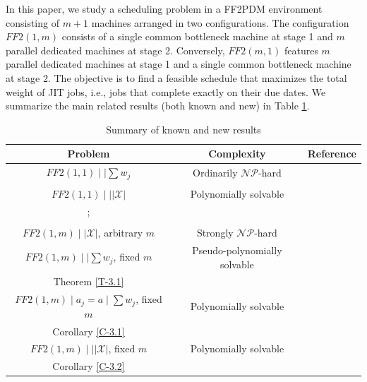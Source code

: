 \documentclass[12pt, eqno, limlimits]{article}
\begin{document}
\begin{sloppypar}
        In this paper, we study a scheduling problem in a FF2PDM environment consisting of $m+1$ machines arranged in two configurations. The configuration $FF2(1, m)$ consists of a single common bottleneck machine at stage 1 and $m$ parallel dedicated machines at stage 2. Conversely, $FF2(m, 1)$ features $m$ parallel dedicated machines at stage 1 and a single common bottleneck machine at stage 2. The objective is to find a feasible schedule that maximizes the total weight of JIT jobs, i.e., jobs that complete exactly on their due dates. We summarize the main related results (both known and new) in Table \ref{tab:main_results}.
        \begin{table}[htpb]
                \footnotesize
                \setlength{\tabcolsep}{2 pt}
                \caption{Summary of known and new results} \label{tab:main_results}
                \vspace{-8pt} 
                \begin{center}
                    \begin{tabular}{|c|c|c|} \hline
                        Problem &  Complexity & Reference \\ \hline
                        $FF2(1, 1) \mid \mid \sum w_j$ & Ordinarily $\mathcal{NP}$-hard & \makecell{\cite{ChoiYoon2007JOS}; \\ \cite{ShabtayBensoussan2012JOS}} \\ \hline
                        $FF2(1, 1) \mid \mid |\mathcal{X}|$	& Polynomially solvable  & \makecell{\cite{ChoiYoon2007JOS}; \\ \cite{Shabtay2012EJOR}; \\ \cite{HeegerHISShabtay2026}} \\ \hline
                        $FF2(1, m)\mid \mid \mathcal{X}|$, arbitrary $m$ & Strongly $\mathcal{NP}$-hard & \cite{HeegerHISShabtay2026} \\ \hline
                        $FF2(1, m)\mid \mid \sum w_j$, fixed $m$ & Pseudo-polynomially solvable	& \makecell{\cite{HeegerHISShabtay2026}; \\  Theorem \ref{T-3.1}} \\ \hline
                        $FF2(1, m)\mid a_j=a \mid \sum w_j$, fixed $m$ & Polynomially solvable	& \makecell{\cite{HeegerHISShabtay2026}; \\  Corollary \ref{C-3.1}} \\ \hline
                        $FF2(1, m)\mid \mid |\mathcal{X}|$, fixed $m$ & Polynomially solvable & \makecell{\cite{HeegerHISShabtay2026}; \\  Corollary \ref{C-3.2}} \\ \hline

\end{tabular}
\end{center}
\end{table}
\end{sloppypar}
\end{document}
